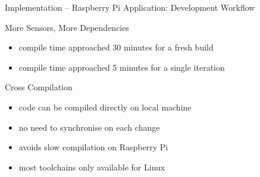 \begin{frame}{Implementation -- Raspberry Pi Application: Development Workflow}
  \begin{block}{More Sensors, More Dependencies}
    \begin{itemize}
      \item compile time approached 30 minutes for a fresh build
      \item compile time approached 5 minutes for a single iteration
    \end{itemize}
  \end{block}

  \begin{block}{ Cross Compilation}
    \begin{itemize}
      \item code can be compiled directly on local machine
      \item no need to synchronise on each change
      \item avoids slow compilation on Raspberry Pi
    \end{itemize}
  \end{block}

  \begin{block}{}
    \begin{itemize}
      \item most toolchains only available for Linux
    \end{itemize}
  \end{block}
\end{frame}

